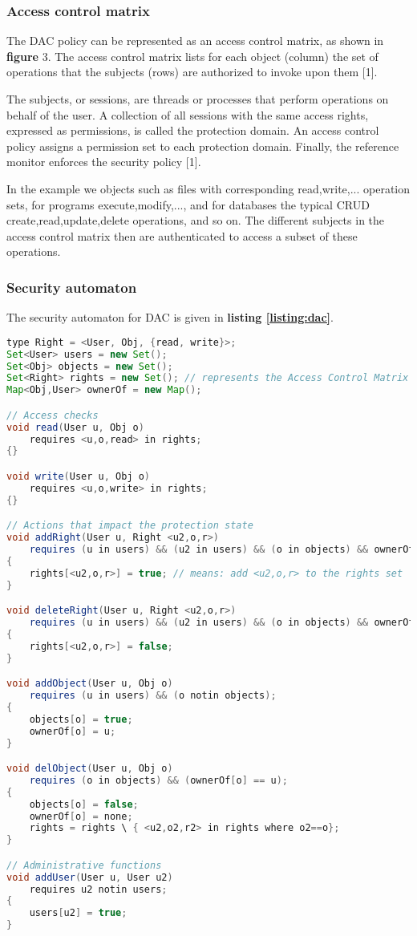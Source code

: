\subsubsection{Access control matrix}

The DAC policy can be represented as an access control matrix, as shown in \textbf{figure} 3. The access control matrix lists for each object (column) the set of operations that the subjects (rows) are authorized to invoke upon them [1].

The subjects, or sessions, are threads or processes that perform operations on behalf of the user. A collection of all sessions with the same access rights, expressed as permissions, is called the protection domain. An access control policy assigns a permission set to each protection domain. Finally, the reference monitor enforces the security policy [1].

In the example we objects such as files with corresponding {read,write,...} operation sets, for programs {execute,modify,...}, and for databases the typical CRUD {create,read,update,delete} operations, and so on. The different subjects in the access control matrix then are authenticated to access a subset of these operations.


\subsubsection{Security automaton}

The security automaton for DAC is given in \textbf{listing \ref{listing:dac}}.

\begin{lstlisting}[language=java, caption=Security automaton for DAC., label=listing:dac]
type Right = <User, Obj, {read, write}>;
Set<User> users = new Set();
Set<Obj> objects = new Set();
Set<Right> rights = new Set(); // represents the Access Control Matrix
Map<Obj,User> ownerOf = new Map(); 

// Access checks
void read(User u, Obj o)
	requires <u,o,read> in rights;
{}

void write(User u, Obj o)
	requires <u,o,write> in rights;
{}

// Actions that impact the protection state
void addRight(User u, Right <u2,o,r>)
	requires (u in users) && (u2 in users) && (o in objects) && ownerOf[o] == u;
{
	rights[<u2,o,r>] = true; // means: add <u2,o,r> to the rights set
} 

void deleteRight(User u, Right <u2,o,r>) 
	requires (u in users) && (u2 in users) && (o in objects) && ownerOf[o] == u;
{
	rights[<u2,o,r>] = false;
}

void addObject(User u, Obj o)
	requires (u in users) && (o notin objects);
{
	objects[o] = true;
	ownerOf[o] = u;
} 

void delObject(User u, Obj o) 
	requires (o in objects) && (ownerOf[o] == u);
{
	objects[o] = false;
	ownerOf[o] = none; 
	rights = rights \ { <u2,o2,r2> in rights where o2==o};
}

// Administrative functions
void addUser(User u, User u2)
	requires u2 notin users;
{
	users[u2] = true;
}
\end{lstlisting}

